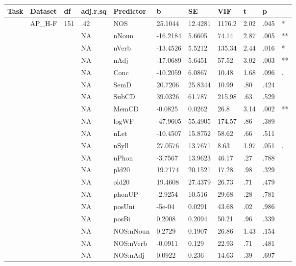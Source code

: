 \begin{table}[ht]
\centering
\begingroup\normalsize
\begin{tabular}{lllllllllll}
  \hline
Task & Dataset & df & adj.r.sq & Predictor & b & SE & VIF & t & p &  \\ 
  \hline
 & AP\_H-F & 151 & .42 & NOS & 25.1044 & 12.4281 & 1176.2 & 2.02 & .045 & * \\ 
   &  &  & NA & nNoun & -16.2184 & 5.6605 & 74.14 & 2.87 & .005 & ** \\ 
   &  &  & NA & nVerb & -13.4526 & 5.5212 & 135.34 & 2.44 & .016 & * \\ 
   &  &  & NA & nAdj & -17.0689 & 5.6451 & 57.52 & 3.02 & .003 & ** \\ 
   &  &  & NA & Conc & -10.2059 & 6.0867 & 10.48 & 1.68 & .096 & . \\ 
   &  &  & NA & SemD & 20.7206 & 25.8344 & 10.99 & .80 & .424 &   \\ 
   &  &  & NA & SubCD & 39.0326 & 61.787 & 215.98 & .63 & .529 &   \\ 
   &  &  & NA & MemCD & -0.0825 & 0.0262 & 26.8 & 3.14 & .002 & ** \\ 
   &  &  & NA & logWF & -47.9605 & 55.4905 & 174.57 & .86 & .389 &   \\ 
   &  &  & NA & nLet & -10.4507 & 15.8752 & 58.62 & .66 & .511 &   \\ 
   &  &  & NA & nSyll & 27.0576 & 13.7671 & 8.63 & 1.97 & .051 & . \\ 
   &  &  & NA & nPhon & -3.7567 & 13.9623 & 46.17 & .27 & .788 &   \\ 
   &  &  & NA & pld20 & 19.7174 & 20.1521 & 17.28 & .98 & .329 &   \\ 
   &  &  & NA & old20 & 19.4608 & 27.4379 & 26.73 & .71 & .479 &   \\ 
   &  &  & NA & phonUP & -2.9254 & 10.516 & 29.68 & .28 & .781 &   \\ 
   &  &  & NA & posUni & -5e-04 & 0.0291 & 43.68 & .02 & .986 &   \\ 
   &  &  & NA & posBi & 0.2008 & 0.2094 & 50.21 & .96 & .339 &   \\ 
   &  &  & NA & NOS:nNoun & 0.2729 & 0.1907 & 26.86 & 1.43 & .154 &   \\ 
   &  &  & NA & NOS:nVerb & -0.0911 & 0.129 & 22.93 & .71 & .481 &   \\ 
   &  &  & NA & NOS:nAdj & 0.0922 & 0.236 & 14.63 & .39 & .697 &   \\ 

\end{tabular}
\end{table}
